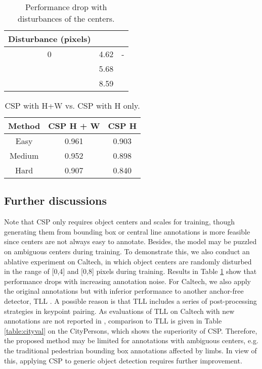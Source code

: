 \documentclass[review]{elsarticle}
\begin{document}
\begin{table}
\begin{center}
\begin{tabular}{c|c|c}
\hline
Disturbance (pixels) &  & \\
\hline
\hline
0 & 4.62 & -\\
\hline
[0, 4] & 5.68& \\
\hline
[0, 8] & 8.59& \\
\hline
\end{tabular}
\end{center}
\caption{Performance drop with disturbances of the centers.}
\label{table:disturb}
\end{table}


\begin{table}
\begin{center}
\begin{tabular}{c|c|c}
\hline
Method & CSP H + W & CSP H \\
\hline
\hline
Easy & 0.961 & 0.903\\
\hline
Medium & 0.952 & 0.898\\
\hline
Hard & 0.907 & 0.840 \\
\hline
\end{tabular}
\end{center}
\caption{CSP with H+W vs. CSP with H only.}
\label{table:arcomp}
\end{table}


\subsection{Further discussions}
Note that CSP only requires object centers and scales for training, though generating them from bounding box or central line annotations is more feasible since centers are not always easy to annotate. Besides, the model may be puzzled on ambiguous centers during training. To demonstrate this, we also conduct an ablative experiment on Caltech, in which object centers are randomly disturbed in the range of [0,4] and [0,8] pixels during training.
Results in Table \ref{table:disturb} show that performance drops with increasing annotation noise. For Caltech, we also apply the original annotations but with inferior performance to another anchor-free detector, TLL \cite{Song_2018_ECCV}. A possible reason is that TLL includes a series of post-processing strategies in keypoint pairing. As evaluations of TLL on Caltech with new annotations\cite{zhang2016far} are not reported in \cite{Song_2018_ECCV}, comparison to TLL is given in Table \ref{table:cityval} on the CityPersons, which shows the superiority of CSP. Therefore, the proposed method may be limited for annotations with ambiguous centers, e.g. the traditional pedestrian bounding box annotations affected by limbs. In view of this, applying CSP to generic object detection requires further improvement.
\end{document}

